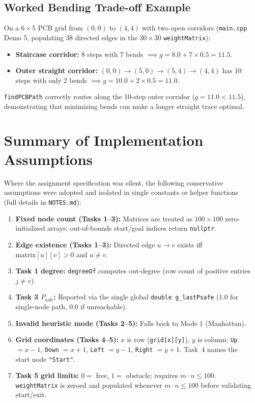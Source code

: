 \documentclass[11pt,a4paper]{article}
\begin{document}
\subsection{Worked Bending Trade-off Example}
On a $6 \times 5$ PCB grid from $(0,0)$ to $(4,4)$ with two open corridors (\texttt{main.cpp} Demo 5, populating $38$ directed edges in the $30 \times 30$ \texttt{weightMatrix}):
\begin{itemize}
    \item \textbf{Staircase corridor:} 8 steps with 7 bends $\implies g = 8.0 + 7 \times 0.5 = 11.5$.
    \item \textbf{Outer straight corridor:} $(0,0)\to(5,0)\to(5,4)\to(4,4)$ has 10 steps with only 2 bends $\implies g = 10.0 + 2 \times 0.5 = 11.0$.
\end{itemize}
\texttt{findPCBPath} correctly routes along the 10-step outer corridor ($g = 11.0 < 11.5$), demonstrating that minimizing bends can make a longer straight trace optimal.

\section{Summary of Implementation Assumptions}

Where the assignment specification was silent, the following conservative assumptions were adopted and isolated in single constants or helper functions (full details in \texttt{NOTES.md}):
\begin{enumerate}
    \item \textbf{Fixed node count (Tasks 1--3):} Matrices are treated as $100 \times 100$ zero-initialized arrays; out-of-bounds start/goal indices return \texttt{nullptr}.
    \item \textbf{Edge existence (Tasks 1--3):} Directed edge $u \to v$ exists iff $\text{matrix}[u][v] > 0$ and $u \neq v$.
    \item \textbf{Task 1 degree:} \texttt{degreeOf} computes out-degree (row count of positive entries $j \neq v$).
    \item \textbf{Task 3 $P_{\text{safe}}$:} Reported via the single global \texttt{double g\_lastPsafe} ($1.0$ for single-node path, $0.0$ if unreachable).
    \item \textbf{Invalid heuristic mode (Tasks 2--5):} Falls back to Mode 1 (Manhattan).
    \item \textbf{Grid coordinates (Tasks 4--5):} $x$ is row (\texttt{grid[x][y]}), $y$ is column; \texttt{Up} $= x-1$, \texttt{Down} $= x+1$, \texttt{Left} $= y-1$, \texttt{Right} $= y+1$. Task~4 names the start node \texttt{"Start"}.
    \item \textbf{Task 5 grid limits:} $0 =$ free, $1 =$ obstacle; requires $m \cdot n \le 100$. \texttt{weightMatrix} is zeroed and populated whenever $m \cdot n \le 100$ before validating start/exit.
\end{enumerate}
\end{document}
